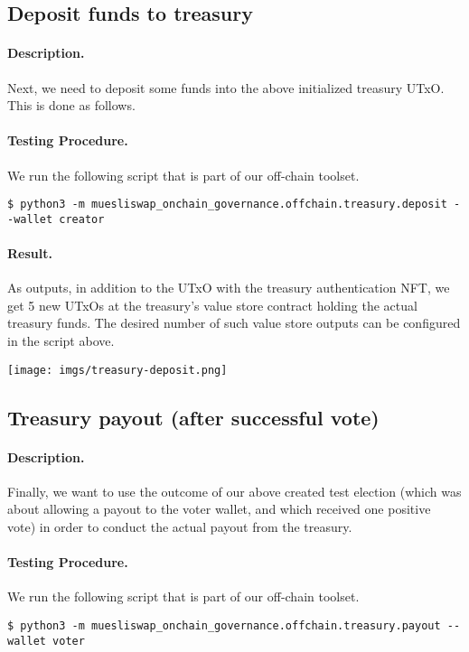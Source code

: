\documentclass[11pt]{article}
\begin{document}
\subsection{Deposit funds to treasury}
\paragraph{Description.} Next, we need to deposit some funds into the above initialized treasury UTxO. This is done as follows.

\paragraph{Testing Procedure.} We run the following script that is part of our off-chain toolset.
\begin{verbatim}
$ python3 -m muesliswap_onchain_governance.offchain.treasury.deposit --wallet creator
\end{verbatim}
\paragraph{Result.} As outputs, in addition to the UTxO with the treasury authentication NFT, we get 5 new UTxOs at the treasury's value store contract holding the actual treasury funds. The desired number of such value store outputs can be configured in the script above.
\bigskip

\texttt{[image: imgs/treasury-deposit.png]}

\subsection{Treasury payout (after successful vote)}
\paragraph{Description.} Finally, we want to use the outcome of our above created test election (which was about allowing a payout to the voter wallet, and which received one positive vote) in order to conduct the actual payout from the treasury.

\paragraph{Testing Procedure.} We run the following script that is part of our off-chain toolset.
\begin{verbatim}
$ python3 -m muesliswap_onchain_governance.offchain.treasury.payout --wallet voter
\end{verbatim}
\end{document}
